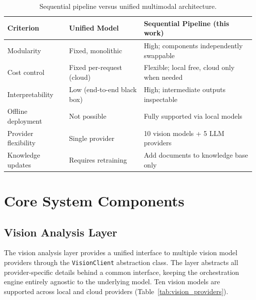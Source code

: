 \documentclass[12pt,a4paper]{report}
\begin{document}
	
	\begin{table}[H]
		\centering
		\caption{Sequential pipeline versus unified multimodal architecture.}
		\label{tab:pipeline_comparison}
		\begin{tabular}{lll}
			\toprule
			\textbf{Criterion} & \textbf{Unified Model} & \textbf{Sequential Pipeline (this work)} \\
			\midrule
			Modularity            & Fixed, monolithic         & High; components independently swappable \\
			Cost control          & Fixed per-request (cloud) & Flexible; local free, cloud only when needed \\
			Interpretability      & Low (end-to-end black box)& High; intermediate outputs inspectable \\
			Offline deployment    & Not possible              & Fully supported via local models \\
			Provider flexibility  & Single provider           & 10 vision models + 5 LLM providers \\
			Knowledge updates     & Requires retraining       & Add documents to knowledge base only \\
			\bottomrule
		\end{tabular}
	\end{table}
	
	
	
	\section{Core System Components}
	\label{sec:components}
	
	\subsection{Vision Analysis Layer}
	\label{sec:vision}
	
	The vision analysis layer provides a unified interface to multiple vision model providers
	through the \texttt{VisionClient} abstraction class. The layer abstracts all
	provider-specific details behind a common interface, keeping the orchestration engine
	entirely agnostic to the underlying model. Ten vision models are supported across local and
	cloud providers (Table~\ref{tab:vision_providers}).

	
	
	
\end{document}
